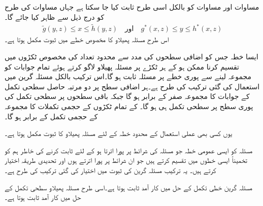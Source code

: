 مساوات  اور مساوات  کو بالکل اسی طرح ثابت کیا جا سکتا ہے جہاں مساوات  کی طرح  کو درج ذیل سے ظاہر کیا جائے گا۔
\begin{align*}
\tilde{g}(y,z) \le x\le \tilde{h}(y,z) \quad \text{اور}\quad g^*(x,z) \le y\le h^*(x,z)
\end{align*}
اس طرح مسئلہ پھیلاو کا مخصوص خطے میں ثبوت مکمل ہوتا ہے۔

ایسا خطہ  جس کو اضافی سطحوں کی مدد سے محدود تعداد کی مخصوص ٹکڑوں میں تقسیم کرنا ممکن ہو کے ہر ٹکڑے پر مسئلہ پھیلاو لاگو کرتے ہوئے تمام جوابات کو مجموعہ لینے سے  پوری خطے پر مسئلہ ثابت ہو گا۔اس ترکیب بالکل مسئلہ گرین میں استعمال کی گئی ترکیب کی طرح ہے۔ہر اضافی سطح پر دو مرتبہ حاصل سطحی تکمل کے جوابات  کا مجموعہ صفر کے برابر ہو گا جبکہ باقی سطحوں پر سطحی تکمل  کی پوری سطح  پر سطحی تکمل ہی ہو گا۔ کے تمام ٹکڑوں کے حجمی تکملات کا مجموعہ  کے حجمی تکمل کے برابر ہو گا۔

یوں کسی بھی عملی استعمال کے محدود خطہ  کے لئے مسئلہ پھیلاو کا ثبوت مکمل ہوتا ہے۔ 


مسئلہ کو ایسی عمومی خطہ  جو مسئلہ کی شرائط پر پورا اترتا ہو کے  لئے ثابت کرنے کی خاطر ہم   کو تخمیناً ایسی خطوں میں تقسیم کرتے ہیں جو ان شرائط پر پورا اترتے ہوں اور تحدیدی طریقہ اختیار کرتے ہیں۔ یہ ترکیب مسئلہ گرین کی ثبوت میں اختیار کی گئی ترکیب کی طرح ہے۔

مسئلہ گرین خطی تکمل کے حل میں کار آمد ثابت ہوتا ہے۔اسی طرح مسئلہ پھیلاو سطحی تکمل کے حل میں کار آمد ثابت ہوتا ہے۔

